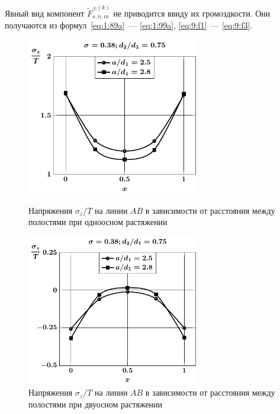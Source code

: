 Явный вид компонент $\tilde F_{s,n,m}^{\pm(k)}$ не приводится ввиду их громоздкости. Они получаются из формул~\eqref{eq:1:89a}~--- \eqref{eq:1:99a}, \eqref{eq:9:f1}~--- \eqref{eq:9:f3}.

\begin{figure}[h!]
\centering\footnotesize
\parbox[b]{7.5cm}{\centering\includegraphics[width=7.5cm]{periodic-cav27-a-d75-t1-sig_z.pdf}
\caption{Напряжения $\sigma_z/T$ на линии $AB$ в зависимости от расстояния между полостями при одноосном растяжении
\label{f:11:24}}}\hfil\hfil
\parbox[b]{7.5cm}{\centering\includegraphics[width=7.5cm]{periodic-cav27-a-d75-t2-sig_z.pdf}
\caption{Напряжения $\sigma_z/T$ на линии $AB$ в зависимости от расстояния между полостями при двуосном растяжении
\label{f:11:25}}}
\end{figure}

